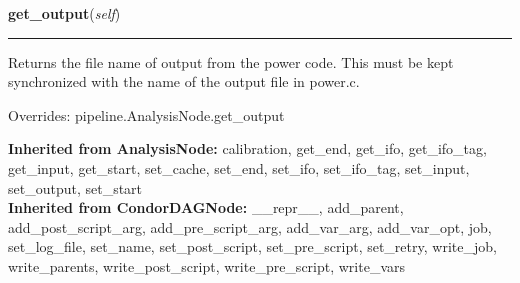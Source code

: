     \label{power:PowerNode:get_output}
    \vspace{0.5ex}

    \begin{boxedminipage}{\textwidth}

    \raggedright \textbf{get\_output}(\textit{self})

    \vspace{-1.5ex}

    \rule{\textwidth}{0.5\fboxrule}
    Returns the file name of output from the power code. This must be 
    kept synchronized with the name of the output file in power.c.

    \vspace{1ex}

      Overrides: pipeline.AnalysisNode.get\_output

    \end{boxedminipage}

  \textbf{Inherited from AnalysisNode:}
    calibration,
    get\_end,
    get\_ifo,
    get\_ifo\_tag,
    get\_input,
    get\_start,
    set\_cache,
    set\_end,
    set\_ifo,
    set\_ifo\_tag,
    set\_input,
    set\_output,
    set\_start
    \\
  \textbf{Inherited from CondorDAGNode:}
    \_\_repr\_\_,
    add\_parent,
    add\_post\_script\_arg,
    add\_pre\_script\_arg,
    add\_var\_arg,
    add\_var\_opt,
    job,
    set\_log\_file,
    set\_name,
    set\_post\_script,
    set\_pre\_script,
    set\_retry,
    write\_job,
    write\_parents,
    write\_post\_script,
    write\_pre\_script,
    write\_vars
